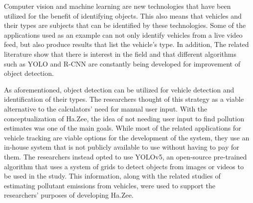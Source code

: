 	Computer vision and machine learning are new technologies that have been utilized for the benefit of identifying objects. This also means that vehicles and their types are subjects that can be identified by these technologies. Some of the applications used as an example can not only identify vehicles from a live video feed, but also produce results that list the vehicle's type. In addition, The related literature show that there is interest in the field and that different algorithms such as YOLO and R-CNN are constantly being developed for improvement of object detection.
	
	As aforementioned, object detection can be utilized for vehicle detection and identification of their types. The researchers thought of this strategy as a viable alternative to the calculators' need for manual user input. With the conceptualization of Ha.Zee, the idea of not needing user input to find pollution estimates was one of the main goals. While most of the related applications for vehicle tracking are viable options for the development of the system, they use an in-house system that is not publicly available to use without having to pay for them. The researchers instead opted to use YOLOv5, an open-source pre-trained algorithm that uses a system of grids to detect objects from images or videos to be used in the study. This information, along with the related studies of estimating pollutant emissions from vehicles, were used to support the researchers’ purposes of developing Ha.Zee.



